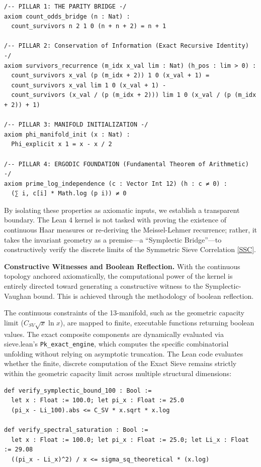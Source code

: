 \documentclass[sn-mathphys-num, pdflatex]{sn-jnl}
\begin{document}
\begin{lstlisting}[language=Lean4, caption={The Axiomatic Bedrock: Defining the Trusted Computing Base}, label={lst:axiomatic_bedrock}]
/-- PILLAR 1: THE PARITY BRIDGE -/
axiom count_odds_bridge (n : Nat) :
  count_survivors n 2 1 0 (n + n + 2) = n + 1

/-- PILLAR 2: Conservation of Information (Exact Recursive Identity) -/
axiom survivors_recurrence (m_idx x_val lim : Nat) (h_pos : lim > 0) :
  count_survivors x_val (p (m_idx + 2)) 1 0 (x_val + 1) =
  count_survivors x_val lim 1 0 (x_val + 1) -
  count_survivors (x_val / (p (m_idx + 2))) lim 1 0 (x_val / (p (m_idx + 2)) + 1)

/-- PILLAR 3: MANIFOLD INITIALIZATION -/
axiom phi_manifold_init (x : Nat) :
  Phi_explicit x 1 = x - x / 2

/-- PILLAR 4: ERGODIC FOUNDATION (Fundamental Theorem of Arithmetic) -/
axiom prime_log_independence (c : Vector Int 12) (h : c ≠ 0) :
  (∑ i, c[i] * Math.log (p i)) ≠ 0
\end{lstlisting}

By isolating these properties as axiomatic inputs, we establish a transparent boundary. The Lean 4 kernel is not tasked with proving the existence of continuous Haar measures or re-deriving the Meissel-Lehmer recurrence; rather, it takes the invariant geometry as a premise—a ``Symplectic Bridge''—to constructively verify the discrete limits of the Symmetric Sieve Correlation \ref{SSC}.

\textbf{Constructive Witnesses and Boolean Reflection.}
With the continuous topology anchored axiomatically, the computational power of the kernel is entirely directed toward generating a constructive witness to the Symplectic-Vaughan bound. This is achieved through the methodology of boolean reflection.

The continuous constraints of the 13-manifold, such as the geometric capacity limit ($C_{SV} \sqrt{x} \ln x$), are mapped to finite, executable functions returning boolean values. The exact composite components are dynamically evaluated via sieve.lean's \texttt{Pk\_exact\_engine}, which computes the specific combinatorial unfolding without relying on asymptotic truncation. The Lean code evaluates whether the finite, discrete computation of the Exact Sieve remains strictly within the geometric capacity limit across multiple structural dimensions:

\begin{lstlisting}[language=Lean4, caption={Constructive Evaluation of the Symplectic Bounds}, label={lst:verification_bounds}]
def verify_symplectic_bound_100 : Bool :=
  let x : Float := 100.0; let pi_x : Float := 25.0
  (pi_x - Li_100).abs <= C_SV * x.sqrt * x.log

def verify_spectral_saturation : Bool :=
  let x : Float := 100.0; let pi_x : Float := 25.0; let Li_x : Float := 29.08
  ((pi_x - Li_x)^2) / x <= sigma_sq_theoretical * (x.log)
\end{lstlisting}
\end{document}
